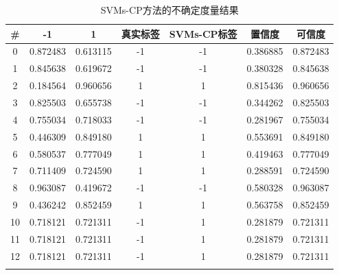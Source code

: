\begin{table}[]
\centering
\caption{SVMs-CP方法的不确定度量结果}
\label{tab:cp-svm}
\begin{tabular}{@{}ccccccc@{}}
\toprule
\#  & -1        & 1        & 真实标签 & SVMs-CP标签 & 置信度 & 可信度 \\ \midrule
0	&0.872483	&0.613115	&-1	&-1	&0.386885	&0.872483\\
1	&0.845638	&0.619672	&-1	&-1	&0.380328	&0.845638\\
2	&0.184564	&0.960656	&1	&1	&0.815436	&0.960656\\
3	&0.825503	&0.655738	&-1	&-1	&0.344262	&0.825503\\
4	&0.755034	&0.718033	&-1	&-1	&0.281967	&0.755034\\
5	&0.446309	&0.849180	&1	&1	&0.553691	&0.849180\\
6	&0.580537	&0.777049	&1	&1	&0.419463	&0.777049\\
7	&0.711409	&0.724590	&1	&1	&0.288591	&0.724590\\
8	&0.963087	&0.419672	&-1	&-1	&0.580328	&0.963087\\
9	&0.436242	&0.852459	&1	&1	&0.563758	&0.852459 \\
10	&0.718121	&0.721311	&-1	&1	&0.281879	&0.721311\\
11	&0.718121	&0.721311	&-1	&1	&0.281879	&0.721311\\
12	&0.718121	&0.721311	&-1	&1	&0.281879	&0.721311\\
\bottomrule
\multicolumn{1}{l}{} & \multicolumn{1}{l}{} & \multicolumn{1}{l}{} & \multicolumn{1}{l}{} & \multicolumn{1}{l}{} & \multicolumn{1}{l}{} & \multicolumn{1}{l}{}
\end{tabular}
\end{table}

